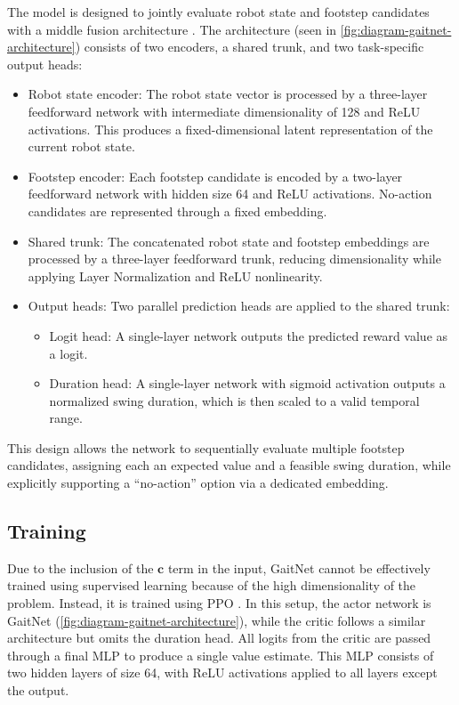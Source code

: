 The model is designed to jointly evaluate robot state and footstep
candidates with a middle fusion architecture \cite{feng2021deep}. The
architecture (seen in \autoref{fig:diagram-gaitnet-architecture})
consists of two encoders, a shared trunk, and two task-specific output heads:

\begin{itemize}
  \item Robot state encoder: The robot state vector is processed by a
    three-layer feedforward network with intermediate dimensionality
    of 128 and ReLU activations. This produces a fixed-dimensional
    latent representation of the current robot state.
  \item Footstep encoder: Each footstep candidate is encoded by a
    two-layer feedforward network with hidden size 64 and ReLU
    activations. No-action candidates are represented through a fixed embedding.
  \item Shared trunk: The concatenated robot state and footstep
    embeddings are processed by a three-layer feedforward trunk,
    reducing dimensionality while applying Layer Normalization and
    ReLU nonlinearity.
  \item Output heads: Two parallel prediction heads are applied to
    the shared trunk:
    \begin{itemize}
      \item Logit head: A single-layer network outputs the predicted
        reward value as a logit.
      \item Duration head: A single-layer network with sigmoid
        activation outputs a normalized swing duration, which is then
        scaled to a valid temporal range.
    \end{itemize}
\end{itemize}

This design allows the network to sequentially evaluate multiple
footstep candidates, assigning each an expected value and a feasible
swing duration, while explicitly supporting a “no-action” option via
a dedicated embedding.

\subsection{Training}
\label{subsec:methodology-gaitnet-training}

Due to the inclusion of the $\mathbf{c}$ term in the input, GaitNet
cannot be effectively trained using supervised learning because of
the high dimensionality of the problem. Instead, it is trained using
PPO \cite{Schulman_proximal_2017}. In this setup, the actor network
is GaitNet (\autoref{fig:diagram-gaitnet-architecture}), while the
critic follows a similar architecture but omits the duration head.
All logits from the critic are passed through a final MLP to produce
a single value estimate. This MLP consists of two hidden layers of
size 64, with ReLU activations applied to all layers except the output.

